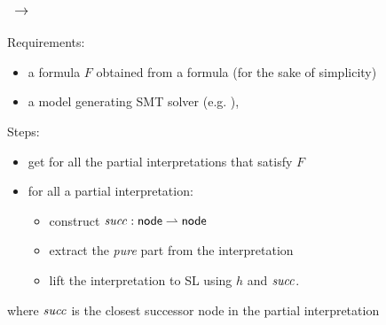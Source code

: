 \documentclass{beamer}
\begin{document}
\begin{frame}
  \frametitle{\LRJQ $\ \rightarrow \ $ \JoshLogic}

  Requirements:
  \begin{itemize}
  \item a \LRJQ formula $F$ obtained from a \JoshLogic formula (for the sake of simplicity)
  \item a model generating SMT solver (e.g. \zthree),
  \end{itemize}

  Steps:
  \begin{itemize}
  \item get for all the partial interpretations that satisfy $F$
  \item for all a partial interpretation:
  \begin{itemize}
  \item construct $\mathit{succ}: \mathsf{node} \rightharpoonup \mathsf{node}$
  \item extract the \emph{pure} part from the interpretation
  \item lift the interpretation to SL using $h$ and $\mathit{succ}$.
  \end{itemize}
  \end{itemize}
  where $\mathit{succ}$ is the closest successor node in the partial interpretation

\end{frame}
\end{document}
